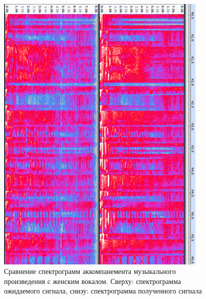 \begin{figure}
	\centering
	\includegraphics[width=0.9\textwidth]{inc/img/spec-music-female}
	\caption{Сравнение спектрограмм аккомпанемента музыкального произведения с женским вокалом. Сверху: спектрограмма ожидаемого сигнала, снизу: спектрограмма полученного сигнала}
	\label{res:femalemusic}
\end{figure}


